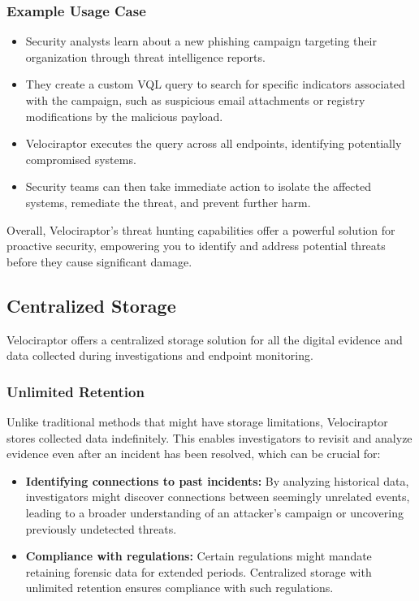 \documentclass[a4paper, 11pt, oneside]{article} %
\begin{document}
\subsubsection{Example Usage Case}
\begin{itemize}
    \item Security analysts learn about a new phishing campaign targeting their organization through threat intelligence reports.
    \item They create a custom VQL query to search for specific indicators associated with the campaign, such as suspicious email attachments or registry modifications by the malicious payload. 
    \item Velociraptor executes the query across all endpoints, identifying potentially compromised systems.
    \item Security teams can then take immediate action to isolate the affected systems, remediate the threat, and prevent further harm.
\end{itemize}
Overall, Velociraptor's threat hunting capabilities offer a powerful solution for proactive security, empowering you to identify and address potential threats before they cause significant damage.
\subsection{Centralized Storage}
Velociraptor offers a centralized storage solution for all the digital evidence and data collected during investigations and endpoint monitoring.
\subsubsection{Unlimited Retention}
Unlike traditional methods that might have storage limitations, Velociraptor stores collected data indefinitely. This enables investigators to revisit and analyze evidence even after an incident has been resolved, which can be crucial for:
\begin{itemize}
    \item \textbf{Identifying connections to past incidents: }By analyzing historical data, investigators might discover connections between seemingly unrelated events, leading to a broader understanding of an attacker's campaign or uncovering previously undetected threats.
    \item \textbf{Compliance with regulations: } Certain regulations might mandate retaining forensic data for extended periods. Centralized storage with unlimited retention ensures compliance with such regulations.
    \end{itemize}
\end{document}
